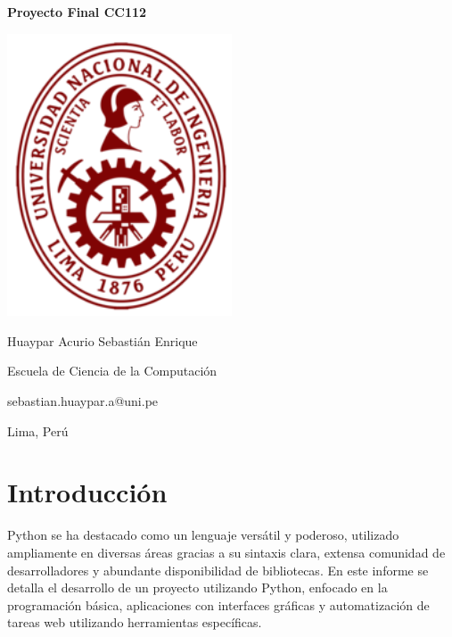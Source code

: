 \documentclass[twocolumn]{article}
\begin{document}
\begin{titlepage}
    \centering
    {\Huge \bfseries Proyecto Final CC112 \par}
    \vspace{2cm}
    \includegraphics[width=0.5\textwidth]{uni_logo.png} 
    \vfill
    {\Large Huaypar Acurio Sebastián Enrique \par}
    \vspace{0.5cm}
    {\large Escuela de Ciencia de la Computación \par}
    \vspace{0.5cm}
    {\large sebastian.huaypar.a@uni.pe \par}
    \vspace{0.5cm}
    {\large Lima, Perú \par}
\end{titlepage}

\onecolumn %
\begin{abstract}
El presente informe detalla el desarrollo del proyecto final del curso CC112, centrado en el uso de Python para resolver problemas y automatizar procesos. Se explora la implementación de ejercicios básicos, una calculadora de tipo de cambio y la automatización de tareas web utilizando herramientas como Tkinter, Ipywidgets y Selenium.
\end{abstract}

\twocolumn %

\section*{Introducción}
Python se ha destacado como un lenguaje versátil y poderoso, utilizado ampliamente en diversas áreas gracias a su sintaxis clara, extensa comunidad de desarrolladores y abundante disponibilidad de bibliotecas. En este informe se detalla el desarrollo de un proyecto utilizando Python, enfocado en la programación básica, aplicaciones con interfaces gráficas y automatización de tareas web utilizando herramientas específicas.
\end{document}
